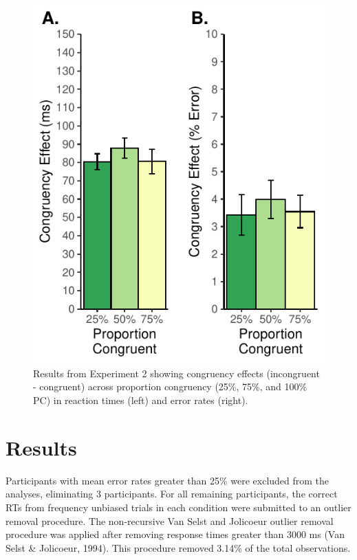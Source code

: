 \documentclass[english,,man,floatsintext]{apa6}
\begin{document}
\begin{figure}
\centering
\includegraphics{manuscript_files/figure-latex/figure3-1.pdf}
\caption{\label{fig:figure3}Results from Experiment 2 showing congruency effects (incongruent - congruent) across proportion congruency (25\%, 75\%, and 100\% PC) in reaction times (left) and error rates (right).}
\end{figure}



\hypertarget{results-1}{%
\section{Results}\label{results-1}}

Participants with mean error rates greater than 25\% were excluded from the analyses, eliminating 3 participants. For all remaining participants, the correct RTs from frequency unbiased trials in each condition were submitted to an outlier removal procedure. The non-recursive Van Selst and Jolicoeur outlier removal procedure was applied after removing response times greater than 3000 ms (Van Selst \& Jolicoeur, 1994). This procedure removed 3.14\% of the total observations.
\end{document}
